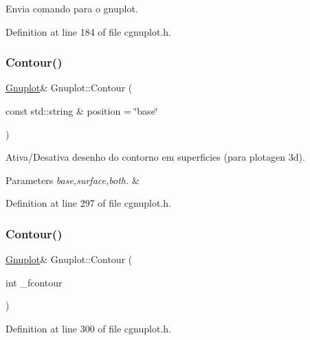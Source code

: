 Envia comando para o gnuplot. 



Definition at line 184 of file cgnuplot.\+h.

\mbox{\label{class_gnuplot_a826a0f860cd984748f8c7ee80228fce7}} 
\subsubsection{\texorpdfstring{Contour()}{Contour()}\hspace{0.1cm}{\footnotesize\ttfamily [1/2]}}
{\footnotesize\ttfamily \hyperlink{class_gnuplot}{Gnuplot}\& Gnuplot\+::\+Contour (\begin{DoxyParamCaption}\item[{const std\+::string \&}]{position = {\ttfamily \char`\"{}base\char`\"{}} }\end{DoxyParamCaption})\hspace{0.3cm}{\ttfamily [inline]}}



Ativa/\+Desativa desenho do contorno em superficies (para plotagen 3d). 


\begin{DoxyParams}{Parameters}
{\em base,surface,both.} & \\
\hline
\end{DoxyParams}


Definition at line 297 of file cgnuplot.\+h.

\mbox{\label{class_gnuplot_ab2918e5653c9d421bf924d7dc2467429}} 
\subsubsection{\texorpdfstring{Contour()}{Contour()}\hspace{0.1cm}{\footnotesize\ttfamily [2/2]}}
{\footnotesize\ttfamily \hyperlink{class_gnuplot}{Gnuplot}\& Gnuplot\+::\+Contour (\begin{DoxyParamCaption}\item[{int}]{\+\_\+fcontour }\end{DoxyParamCaption})\hspace{0.3cm}{\ttfamily [inline]}}



Definition at line 300 of file cgnuplot.\+h.

